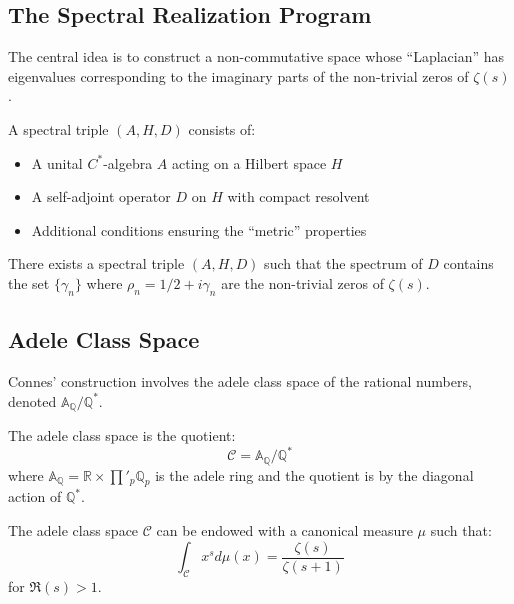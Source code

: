 \subsection{The Spectral Realization Program}

The central idea is to construct a non-commutative space whose ``Laplacian'' has eigenvalues corresponding to the imaginary parts of the non-trivial zeros of $\zeta(s)$.

\begin{definition}
\label{def:spectral_triple}
A spectral triple $(A, H, D)$ consists of:
\begin{itemize}
\item A unital $C^*$-algebra $A$ acting on a Hilbert space $H$
\item A self-adjoint operator $D$ on $H$ with compact resolvent
\item Additional conditions ensuring the ``metric'' properties
\end{itemize}
\end{definition}

\begin{conjecture}
\label{conj:connes_spectral}
There exists a spectral triple $(A, H, D)$ such that the spectrum of $D$ contains the set $\{\gamma_n\}$ where $\rho_n = 1/2 + i\gamma_n$ are the non-trivial zeros of $\zeta(s)$.
\end{conjecture}

\subsection{Adele Class Space}

Connes' construction involves the adele class space of the rational numbers, denoted $\mathbb{A}_{\mathbb{Q}}/\mathbb{Q}^*$.

\begin{definition}
\label{def:adele_class_space}
The adele class space is the quotient:
\begin{equation}
\mathcal{C} = \mathbb{A}_{\mathbb{Q}}/\mathbb{Q}^*
\label{eq:adele_class_space}
\end{equation}
where $\mathbb{A}_{\mathbb{Q}} = \mathbb{R} \times \prod'_p \mathbb{Q}_p$ is the adele ring and the quotient is by the diagonal action of $\mathbb{Q}^*$.
\end{definition}

\begin{theorem}
\label{thm:connes_consani}
The adele class space $\mathcal{C}$ can be endowed with a canonical measure $\mu$ such that:
\begin{equation}
\int_{\mathcal{C}} x^s d\mu(x) = \frac{\zeta(s)}{\zeta(s+1)}
\label{eq:connes_measure}
\end{equation}
for $\Re(s) > 1$.
\end{theorem}

